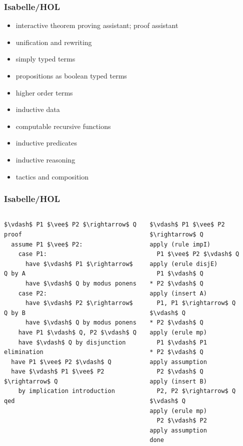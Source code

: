 \documentclass{beamer}
\begin{document}
\begin{frame}
\frametitle{Isabelle/HOL}
\begin{itemize}
\item interactive theorem proving assistant; proof assistant
\item unification and rewriting
\item simply typed terms
\item propositions as boolean typed terms
\item higher order terms
\item inductive data
\item computable recursive functions
\item inductive predicates
\item inductive reasoning
\item tactics and composition
\end{itemize}
\end{frame}



\begin{frame}[fragile]
	\frametitle{Isabelle/HOL}
\begin{columns}
\begin{column}{0.5\textwidth}
\begin{lstlisting}[language=logic, mathescape]
$\vdash$ P1 $\vee$ P2 $\rightarrow$ Q
proof
  assume P1 $\vee$ P2:
    case P1:
      have $\vdash$ P1 $\rightarrow$ Q by A
      have $\vdash$ Q by modus ponens
    case P2:
      have $\vdash$ P2 $\rightarrow$ Q by B    
      have $\vdash$ Q by modus ponens
    have P1 $\vdash$ Q, P2 $\vdash$ Q
    have $\vdash$ Q by disjunction elimination
  have P1 $\vee$ P2 $\vdash$ Q
  have $\vdash$ P1 $\vee$ P2 $\rightarrow$ Q
    by implication introduction  
qed
\end{lstlisting}
\end{column}

\begin{column}{0.5\textwidth}
\begin{lstlisting}[language=logic, mathescape]
$\vdash$ P1 $\vee$ P2 $\rightarrow$ Q
apply (rule impI)
  P1 $\vee$ P2 $\vdash$ Q
apply (erule disjE)
  P1 $\vdash$ Q
* P2 $\vdash$ Q
apply (insert A)
  P1, P1 $\rightarrow$ Q $\vdash$ Q
* P2 $\vdash$ Q
apply (erule mp)
  P1 $\vdash$ P1
* P2 $\vdash$ Q
apply assumption 
  P2 $\vdash$ Q
apply (insert B)
  P2, P2 $\rightarrow$ Q $\vdash$ Q
apply (erule mp)
  P2 $\vdash$ P2
apply assumption 
done
\end{lstlisting}
\end{column}
\end{columns}
\end{frame}
\end{document}
